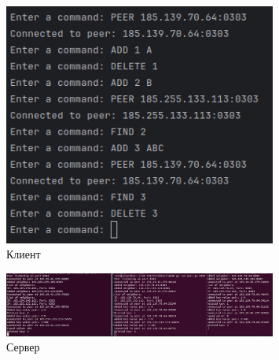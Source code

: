 \documentclass[a4paper, 14pt]{extarticle}
\begin{document}
\newpage

\begin{figure}[!htb]
	\centering
	\includegraphics[width=0.8\textwidth]{res1.png}
\caption{Клиент}
\label{fig:img1}
\end{figure}
\begin{figure}[!htb]
	\centering
	\includegraphics[width=0.8\textwidth]{res2.png}
\caption{Сервер}
\label{fig:img2}
\end{figure}
\end{document}
